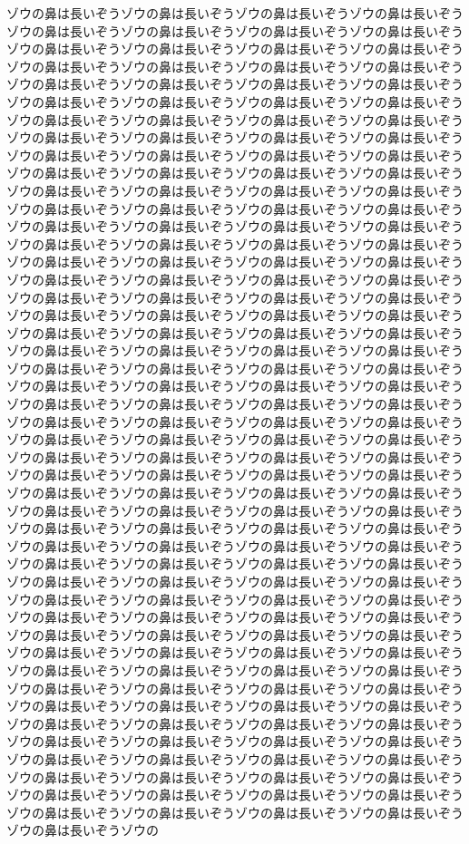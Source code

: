 ゾウの鼻は長いぞうゾウの鼻は長いぞうゾウの鼻は長いぞうゾウの鼻は長いぞうゾウの鼻は長いぞうゾウの鼻は長いぞうゾウの鼻は長いぞうゾウの鼻は長いぞうゾウの鼻は長いぞうゾウの鼻は長いぞうゾウの鼻は長いぞうゾウの鼻は長いぞうゾウの鼻は長いぞうゾウの鼻は長いぞうゾウの鼻は長いぞうゾウの鼻は長いぞうゾウの鼻は長いぞうゾウの鼻は長いぞうゾウの鼻は長いぞうゾウの鼻は長いぞうゾウの鼻は長いぞうゾウの鼻は長いぞうゾウの鼻は長いぞうゾウの鼻は長いぞうゾウの鼻は長いぞうゾウの鼻は長いぞうゾウの鼻は長いぞうゾウの鼻は長いぞうゾウの鼻は長いぞうゾウの鼻は長いぞうゾウの鼻は長いぞうゾウの鼻は長いぞうゾウの鼻は長いぞうゾウの鼻は長いぞうゾウの鼻は長いぞうゾウの鼻は長いぞうゾウの鼻は長いぞうゾウの鼻は長いぞうゾウの鼻は長いぞうゾウの鼻は長いぞうゾウの鼻は長いぞうゾウの鼻は長いぞうゾウの鼻は長いぞうゾウの鼻は長いぞうゾウの鼻は長いぞうゾウの鼻は長いぞうゾウの鼻は長いぞうゾウの鼻は長いぞうゾウの鼻は長いぞうゾウの鼻は長いぞうゾウの鼻は長いぞうゾウの鼻は長いぞうゾウの鼻は長いぞうゾウの鼻は長いぞうゾウの鼻は長いぞうゾウの鼻は長いぞうゾウの鼻は長いぞうゾウの鼻は長いぞうゾウの鼻は長いぞうゾウの鼻は長いぞうゾウの鼻は長いぞうゾウの鼻は長いぞうゾウの鼻は長いぞうゾウの鼻は長いぞうゾウの鼻は長いぞうゾウの鼻は長いぞうゾウの鼻は長いぞうゾウの鼻は長いぞうゾウの鼻は長いぞうゾウの鼻は長いぞうゾウの鼻は長いぞうゾウの鼻は長いぞうゾウの鼻は長いぞうゾウの鼻は長いぞうゾウの鼻は長いぞうゾウの鼻は長いぞうゾウの鼻は長いぞうゾウの鼻は長いぞうゾウの鼻は長いぞうゾウの鼻は長いぞうゾウの鼻は長いぞうゾウの鼻は長いぞうゾウの鼻は長いぞうゾウの鼻は長いぞうゾウの鼻は長いぞうゾウの鼻は長いぞうゾウの鼻は長いぞうゾウの鼻は長いぞうゾウの鼻は長いぞうゾウの鼻は長いぞうゾウの鼻は長いぞうゾウの鼻は長いぞうゾウの鼻は長いぞうゾウの鼻は長いぞうゾウの鼻は長いぞうゾウの鼻は長いぞうゾウの鼻は長いぞうゾウの鼻は長いぞうゾウの鼻は長いぞうゾウの鼻は長いぞうゾウの鼻は長いぞうゾウの鼻は長いぞうゾウの鼻は長いぞうゾウの鼻は長いぞうゾウの鼻は長いぞうゾウの鼻は長いぞうゾウの鼻は長いぞうゾウの鼻は長いぞうゾウの鼻は長いぞうゾウの鼻は長いぞうゾウの鼻は長いぞうゾウの鼻は長いぞうゾウの鼻は長いぞうゾウの鼻は長いぞうゾウの鼻は長いぞうゾウの鼻は長いぞうゾウの鼻は長いぞうゾウの鼻は長いぞうゾウの鼻は長いぞうゾウの鼻は長いぞうゾウの鼻は長いぞうゾウの鼻は長いぞうゾウの鼻は長いぞうゾウの鼻は長いぞうゾウの鼻は長いぞうゾウの鼻は長いぞうゾウの鼻は長いぞうゾウの鼻は長いぞうゾウの鼻は長いぞうゾウの鼻は長いぞうゾウの鼻は長いぞうゾウの鼻は長いぞうゾウの鼻は長いぞうゾウの鼻は長いぞうゾウの鼻は長いぞうゾウの鼻は長いぞうゾウの鼻は長いぞうゾウの鼻は長いぞうゾウの鼻は長いぞうゾウの鼻は長いぞうゾウの鼻は長いぞうゾウの鼻は長いぞうゾウの鼻は長いぞうゾウの鼻は長いぞうゾウの鼻は長いぞうゾウの鼻は長いぞうゾウの鼻は長いぞうゾウの鼻は長いぞうゾウの鼻は長いぞうゾウの鼻は長いぞうゾウの鼻は長いぞうゾウの鼻は長いぞうゾウの鼻は長いぞうゾウの鼻は長いぞうゾウの鼻は長いぞうゾウの鼻は長いぞうゾウの鼻は長いぞうゾウの鼻は長いぞうゾウの鼻は長いぞうゾウの鼻は長いぞうゾウの鼻は長いぞうゾウの鼻は長いぞうゾウの鼻は長いぞうゾウの鼻は長いぞうゾウの鼻は長いぞうゾウの鼻は長いぞうゾウの鼻は長いぞうゾウの鼻は長いぞうゾウの鼻は長いぞうゾウの鼻は長いぞうゾウの鼻は長いぞうゾウの鼻は長いぞうゾウの鼻は長いぞうゾウの鼻は長いぞうゾウの鼻は長いぞうゾウの鼻は長いぞうゾウの鼻は長いぞうゾウの鼻は長いぞうゾウの鼻は長いぞうゾウの鼻は長いぞうゾウの鼻は長いぞうゾウの鼻は長いぞうゾウの鼻は長いぞうゾウの鼻は長いぞうゾウの鼻は長いぞうゾウの